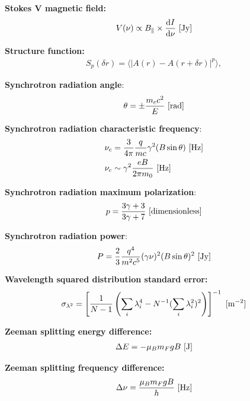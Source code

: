 \documentclass[a4paper,10pt]{article}
\begin{document}
{\noindent}\textbf{Stokes V magnetic field:}
\begin{align*}
    V(\nu) \propto B_\parallel \times \frac{\mathrm{d}I}{\mathrm{d}\nu} ~ [\rm Jy]
\end{align*}

{\noindent}\textbf{Structure function:}
\begin{align*}
    S_p(\delta r) = \langle\lvert A(r)-A(r+\delta r)\rvert^p\rangle,
\end{align*}

{\noindent}\textbf{Synchrotron radiation angle}:
\begin{align*}
\theta = \pm \frac{m_cc^2}{E} ~ [\rm rad]
\end{align*}

{\noindent}\textbf{Synchrotron radiation characteristic frequency}:
\begin{align*}
\nu_c &= \dfrac{3}{4\pi}\dfrac{q}{mc}\gamma^2(B\sin\theta)~[{\rm Hz}] \\
\nu_c &\sim \gamma^2 \frac{eB}{2\pi m_0} ~ [{\rm Hz}]
\end{align*}

{\noindent}\textbf{Synchrotron radiation maximum polarization}:
\begin{align*}
p = \frac{3\gamma + 3}{3\gamma+7} ~ [{\rm dimensionless}]
\end{align*}

{\noindent}\textbf{Synchrotron radiation power}:
\begin{align*}
P = \frac{2}{3}\dfrac{q^4}{m^2c^5}(\gamma\nu)^2(B\sin\theta)^2 ~ [{\rm Jy}]
\end{align*}

{\noindent}\textbf{Wavelength squared distribution standard error:} 
\begin{align*}
\sigma_{\lambda^2} = \left[ \dfrac{1}{N-1} \left( \sum_i\lambda_i^4 - N^{-1}(\sum_i\lambda_i^2)^2 \right) \right]^{-1} ~ [{\rm m^{-2}}]
\end{align*}

{\noindent}\textbf{Zeeman splitting energy difference:}
\begin{align*}
    \Delta E = -\mu_Bm_FgB ~ [{\rm J}]
\end{align*}

{\noindent}\textbf{Zeeman splitting frequency difference:}
\begin{align*}
    \Delta\nu = \frac{\mu_Bm_FgB}{h} ~ [{\rm Hz}]
\end{align*}
\end{document}
